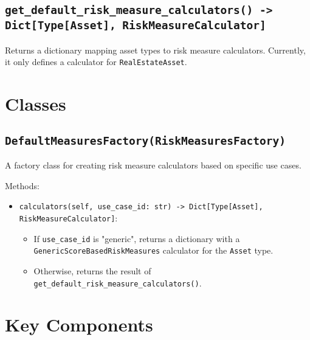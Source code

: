 \documentclass{article}
\begin{document}
\subsection{\texttt{get\_default\_risk\_measure\_calculators() -> Dict[Type[Asset], RiskMeasureCalculator]}}

Returns a dictionary mapping asset types to risk measure calculators. Currently, it only defines a calculator for \texttt{RealEstateAsset}.

\section{Classes}

\subsection{\texttt{DefaultMeasuresFactory(RiskMeasuresFactory)}}

A factory class for creating risk measure calculators based on specific use cases.

Methods:
\begin{itemize}
    \item \texttt{calculators(self, use\_case\_id: str) -> Dict[Type[Asset], RiskMeasureCalculator]}:
    \begin{itemize}
        \item If \texttt{use\_case\_id} is "generic", returns a dictionary with a \texttt{GenericScoreBasedRiskMeasures} calculator for the \texttt{Asset} type.
        \item Otherwise, returns the result of \texttt{get\_default\_risk\_measure\_calculators()}.
    \end{itemize}
\end{itemize}

\section{Key Components}
\end{document}

